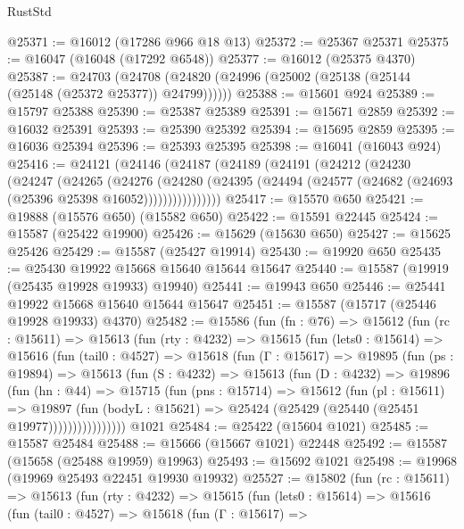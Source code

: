 \begin{lexlean}{RustStd}
\begin{coremodule}
@25371 := @16012 (@17286 @966 @18 @13)
@25372 := @25367 @25371
@25375 := @16047 (@16048 (@17292 @6548))
@25377 := @16012 (@25375 @4370)
@25387 := @24703
    (@24708 (@24820 (@24996 (@25002 (@25138 (@25144 (@25148 (@25372 @25377)) @24799))))))
@25388 := @15601 @924
@25389 := @15797 @25388
@25390 := @25387 @25389
@25391 := @15671 @2859
@25392 := @16032 @25391
@25393 := @25390 @25392
@25394 := @15695 @2859
@25395 := @16036 @25394
@25396 := @25393 @25395
@25398 := @16041 (@16043 @924)
@25416 := @24121
    (@24146
      (@24187
        (@24189
          (@24191
            (@24212
              (@24230
                (@24247
                  (@24265
                    (@24276
                      (@24280
                        (@24395
                          (@24494 (@24577 (@24682 (@24693 (@25396 @25398 @16052))))))))))))))))
@25417 := @15570 @650
@25421 := @19888 (@15576 @650) (@15582 @650)
@25422 := @15591 @22445
@25424 := @15587 (@25422 @19900)
@25426 := @15629 (@15630 @650)
@25427 := @15625 @25426
@25429 := @15587 (@25427 @19914)
@25430 := @19920 @650
@25435 := @25430 @19922 @15668 @15640 @15644 @15647
@25440 := @15587 (@19919 (@25435 @19928 @19933) @19940)
@25441 := @19943 @650
@25446 := @25441 @19922 @15668 @15640 @15644 @15647
@25451 := @15587 (@15717 (@25446 @19928 @19933) @4370)
@25482 := @15586
    (fun (fn : @76) =>
    @15612
      (fun (rc : @15611) =>
      @15613
        (fun (rty : @4232) =>
        @15615
          (fun (lets0 : @15614) =>
          @15616
            (fun (tail0 : @4527) =>
            @15618
              (fun (Γ : @15617) =>
              @19895
                (fun (ps : @19894) =>
                @15613
                  (fun (S : @4232) =>
                  @15613
                    (fun (D : @4232) =>
                    @19896
                      (fun (hn : @44) =>
                      @15715
                        (fun (pns : @15714) =>
                        @15612
                          (fun (pl : @15611) =>
                          @19897
                            (fun (bodyL : @15621) =>
                            @25424 (@25429 (@25440 (@25451 @19977))))))))))))))))
    @1021
@25484 := @25422 (@15604 @1021)
@25485 := @15587 @25484
@25488 := @15666 (@15667 @1021) @22448
@25492 := @15587 (@15658 (@25488 @19959) @19963)
@25493 := @15692 @1021
@25498 := @19968 (@19969 @25493 @22451 @19930 @19932)
@25527 := @15802
    (fun (rc : @15611) =>
    @15613
      (fun (rty : @4232) =>
      @15615
        (fun (lets0 : @15614) =>
        @15616
          (fun (tail0 : @4527) =>
          @15618
            (fun (Γ : @15617) =>

\end{coremodule}
\end{lexlean}
